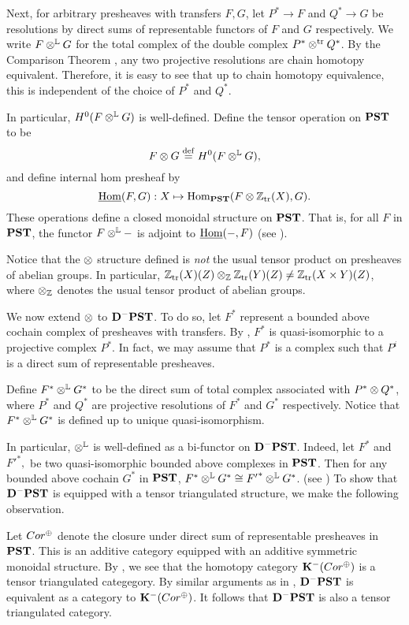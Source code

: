 Next, for arbitrary presheaves with transfers $F, G$, let $P^* \to 
F$ and $Q^* \to G$ be resolutions by direct sums of representable 
functors of $F$ and $G$ respectively. We write $F \tL G$ for the 
total complex of the double complex $P^* \ttr Q^*$. By the 
Comparison Theorem \cite[2.26]{WH}, any two projective resolutions 
are chain homotopy equivalent. Therefore, it is easy to see that 
up to chain homotopy equivalence, this is independent of the 
choice of $P^*$ and $Q^*$.

In particular, $H^0(F \tL G)$ is well-defined. Define the tensor 
operation on $\PST$ to be
\[
F \tensor G \defeq H^0(F \tL G),
\]
and define internal hom presheaf by
\[
\ihom(F, G): X \mapsto \hom_{\PST}(F \tensor \Ztr(X), G).
\]
These operations define a closed monoidal structure on $\PST$.
That is, for all $F$ in $\PST$, the functor $F \tL -$ is adjoint to 
$\ihom(-, F)$ (see \cite[8.3]{MVW}).

\begin{rmk}
Notice that the $\tensor$ structure defined is \emph{not} the
usual tensor product on presheaves of abelian groups. In 
particular, $\Ztr(X)(Z) \tensor_{\Z} \Ztr(Y)(Z) \neq 
\Ztr(X \times Y)(Z)$, where $\tensor_{\Z}$ denotes the usual 
tensor product of abelian groups.
\end{rmk}

We now extend $\tensor$ to $\DCat[D]^-\PST$. To do so, let $F^*$ 
represent a bounded above cochain complex of presheaves with 
transfers. By \cite[10.5.6]{WH}, $F^*$ is quasi-isomorphic to a 
projective complex $P^*$. In fact, we may assume that $P^*$ is a 
complex such that $P^i$ is a direct sum of representable 
presheaves. 

Define $F^* \tL G^*$ to be the direct sum of total complex associated
with $P^* \tensor Q^*$, where $P^*$ and $Q^*$ are projective
resolutions of $F^*$ and $G^*$ respectively. Notice that $F^* \tL G^*$
is defined up to unique quasi-isomorphism.

In particular, $\tL$ is well-defined as a bi-functor on 
$\DCat[D]^-\PST$. Indeed, let $F^*$ and ${F'}^*,$ be two 
quasi-isomorphic bounded above complexes in $\PST$. Then for any 
bounded above cochain $G^*$ in $\PST$, $F^* \tL G^* \cong {F'}^* \tL G^*$. 
(see \cite[8.7]{MVW}) To show that $\DCat^-\PST$ is equipped
with a tensor triangulated structure, we make the following 
observation.

Let $\Cor^{\oplus}$ denote the closure under direct 
sum of representable presheaves in $\PST$. This is an additive
category equipped with an additive symmetric monoidal structure.
By \cite[8A.4]{MVW}, we see that the homotopy category 
$\DCat[K]^-(\Cor^{\oplus})$ is a tensor triangulated categegory.
By similar arguments as in \cite[10.4.8]{WH}, $\DCat[D]^-\PST$
is equivalent as a category to $\DCat[K]^-(\Cor^{\oplus})$.
It follows that $\DCat[D]^-\PST$ is also a tensor triangulated 
category.

